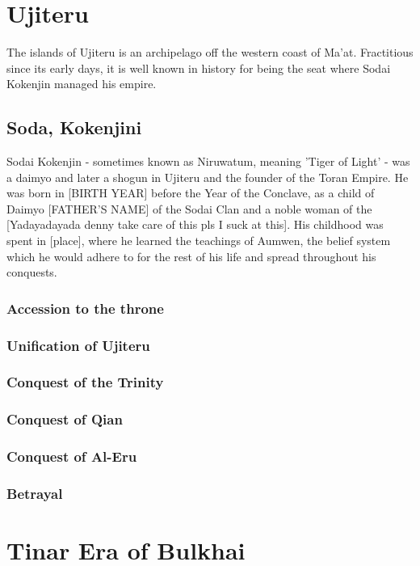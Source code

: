 \begin{multicols}{2}
	\section{Ujiteru}
		The islands of Ujiteru is an archipelago off the western coast of Ma'at. Fractitious since its early days, it is well known in history for being the seat where Sodai Kokenjin managed his empire.
		\subsection{Soda, Kokenjini}
					 
			Sodai Kokenjin - sometimes known as Niruwatum, meaning 'Tiger of Light' - was a daimyo and later a shogun in Ujiteru and the founder of the Toran Empire. He was born in [BIRTH YEAR] before the Year of the Conclave, as a child of Daimyo [FATHER'S NAME] of the Sodai Clan and a noble woman of the [Yadayadayada denny take care of this pls I suck at this]. His childhood was spent in [place], where he learned the teachings of Aumwen, the belief system which he would adhere to for the rest of his life and spread throughout his conquests.\par
			\subsubsection{Accession to the throne}
			\subsubsection{Unification of Ujiteru}
			\subsubsection{Conquest of the Trinity}
			\subsubsection{Conquest of Qian}
			\subsubsection{Conquest of Al-Eru}
			\subsubsection{Betrayal}
	\section{Tinar Era of Bulkhai}

\end{multicols}
